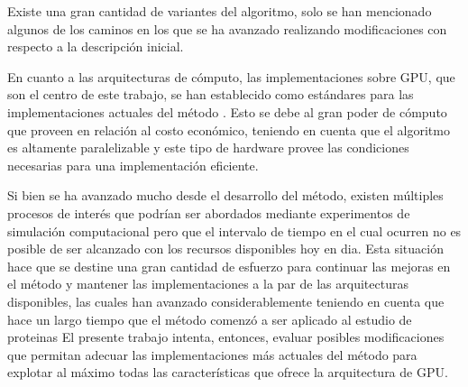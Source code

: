 Existe una gran cantidad de variantes del algoritmo, solo se han mencionado algunos de los caminos en los que se ha avanzado realizando modificaciones con respecto a la descripción inicial.

En cuanto a las arquitecturas de cómputo, las implementaciones sobre GPU, que son el centro de este trabajo, se han establecido como estándares para las implementaciones actuales del método \cite{stone2010gpu,friedrichs2009accelerating}.
Esto se debe al gran poder de cómputo que proveen en relación al costo económico, teniendo en cuenta que el algoritmo es altamente paralelizable y este tipo de hardware provee las condiciones
necesarias para una implementación eficiente.

% 

Si bien se ha avanzado mucho desde el desarrollo del método, existen múltiples procesos de interés que podrían ser abordados mediante experimentos de simulación computacional pero que el intervalo de 
tiempo en el cual ocurren no es posible de ser alcanzado con los recursos disponibles hoy en dia.
Esta situación hace que se destine una gran cantidad de esfuerzo para continuar las mejoras en el método y mantener las implementaciones a la par de las arquitecturas disponibles, 
las cuales han avanzado considerablemente teniendo en cuenta que hace un largo tiempo que el método comenzó a ser aplicado al estudio de proteinas \cite{mccamm0n1977dynamics}
El presente trabajo intenta, entonces, evaluar posibles modificaciones que permitan adecuar las implementaciones más actuales del método para explotar al máximo todas las características 
que ofrece la arquitectura de GPU. 




